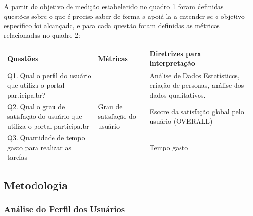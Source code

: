 A partir do objetivo de medição estabelecido no quadro 1  foram definidas questões sobre o que é preciso saber de forma a apoiá-la a entender se o objetivo específico foi alcançado, e para cada questão foram definidas as métricas relacionadas no quadro 2: 

\begin{table}[h]
\begin{tabular}{| p{5cm} |l|l|}
\hline
\textbf{Questões}                                                          & Métricas                      & Diretrizes para interpretação                                                       \\ \hline
Q1. Qual o perfil do usuário que utiliza o portal participa.br?            &                               & Análise de Dados Estatísticos, criação de personas, análise dos dados qualitativos. \\ \hline
Q2. Qual o grau de satisfação do usuário que utiliza o portal participa.br & Grau de satisfação do usuário & Escore da satisfação global pelo usuário (OVERALL)                                  \\ \hline
Q3. Quantidade de tempo gasto para realizar as tarefas      &                               & Tempo gasto                       \\ \hline
\end{tabular}
\end{table}

\subsection{Metodologia}

\subsubsection{Análise do Perfil dos Usuários}

